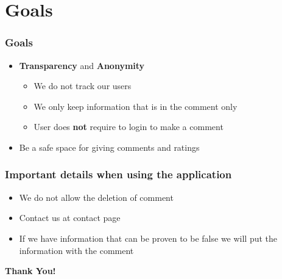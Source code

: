 \documentclass[aspectratio=169]{beamer}
\begin{document}
\section{Goals}
\begin{frame}
    \frametitle{Goals}
    \begin{spacing}{1.5}
        \begin{itemize}
            \item {\color{blue}\textbf{Transparency}} and {\color{blue}\textbf{Anonymity}}
                  \begin{itemize}
                      \item We do not track our users
                      \item We only keep information that is in the comment only
                      \item User does \textbf{not} require to login to make a comment
                  \end{itemize}
            \item Be a safe space for giving comments and ratings
        \end{itemize}
    \end{spacing}
\end{frame}
\begin{frame}
    \frametitle{Important details when using the application}
    \begin{itemize}
        \item We do not allow the deletion of comment
        \item Contact us at contact page
        \item If we have information that can be proven to be false we will put the information with the comment
    \end{itemize}
\end{frame}
\begin{frame}
    \centering
    \huge{\textbf{Thank You!}}
\end{frame}
\end{document}
